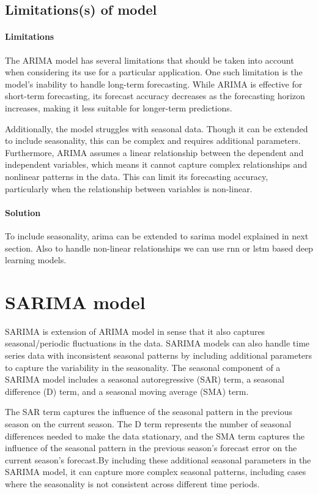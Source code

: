 \documentclass{article}
\begin{document}
\subsection{Limitations(s) of model}

\paragraph{Limitations} The ARIMA model has several limitations that should be taken into account when considering its use for a particular application. One such limitation is the model's inability to handle long-term forecasting. While ARIMA is effective for short-term forecasting, its forecast accuracy decreases as the forecasting horizon increases, making it less suitable for longer-term predictions.

Additionally, the model struggles with seasonal data. Though it can be extended to include seasonality, this can be complex and requires additional parameters. Furthermore, ARIMA assumes a linear relationship between the dependent and independent variables, which means it cannot capture complex relationships and nonlinear patterns in the data. This can limit its forecasting accuracy, particularly when the relationship between variables is non-linear. 

\paragraph{Solution} To include seasonality, arima can be extended to sarima model explained in next section. Also to handle non-linear relationships we can use rnn or lstm based deep learning models.


\section{\centering SARIMA model}

SARIMA is extension of ARIMA model in sense that it also captures seasonal/periodic fluctuations in the data. SARIMA models can also handle time series data with inconsistent seasonal patterns by including additional parameters to capture the variability in the seasonality. The seasonal component of a SARIMA model includes a seasonal autoregressive (SAR) term, a seasonal difference (D) term, and a seasonal moving average (SMA) term.

\vspace{1em}
The SAR term captures the influence of the seasonal pattern in the previous season on the current season. The D term represents the number of seasonal differences needed to make the data stationary, and the SMA term captures the influence of the seasonal pattern in the previous season's forecast error on the current season's forecast.By including these additional seasonal parameters in the SARIMA model, it can capture more complex seasonal patterns, including cases where the seasonality is not consistent across different time periods.
\end{document}
